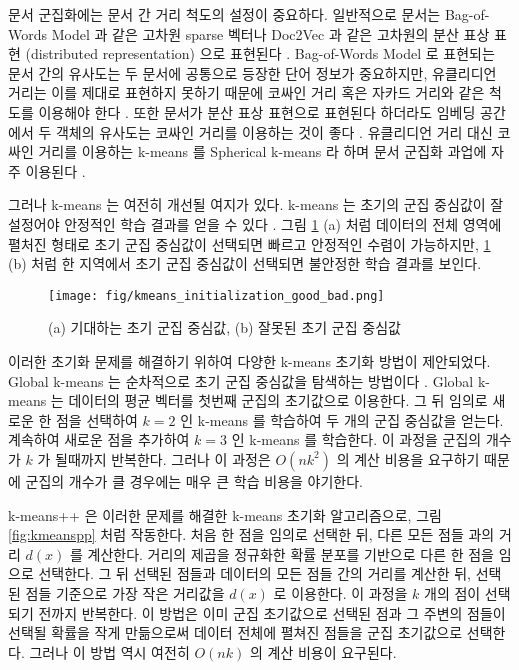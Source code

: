 \documentclass[oneside, ko,phd]{snuthesis_utf8_kor}
\begin{document}
문서 군집화에는 문서 간 거리 척도의 설정이 중요하다.
일반적으로 문서는 Bag-of-Words Model 과 같은 고차원 sparse 벡터나 Doc2Vec 과 같은 고차원의 분산 표상 표현 (distributed representation) 으로 표현된다 \cite{le2014distributed, dai2015document}.
Bag-of-Words Model 로 표현되는 문서 간의 유사도는 두 문서에 공통으로 등장한 단어 정보가 중요하지만, 유클리디언 거리는 이를 제대로 표현하지 못하기 때문에 코싸인 거리 혹은 자카드 거리와 같은 척도를 이용해야 한다 \cite{huang2008similarity}.
또한 문서가 분산 표상 표현으로 표현된다 하더라도 임베딩 공간에서 두 객체의 유사도는 코싸인 거리를 이용하는 것이 좋다 \cite{levy2015improving}.
유클리디언 거리 대신 코싸인 거리를 이용하는 k-means 를 Spherical k-means 라 하며 문서 군집화 과업에 자주 이용된다 \cite{dhillon2002iterative, buchta2012spherical}.

그러나 k-means 는 여전히 개선될 여지가 있다.
k-means 는 초기의 군집 중심값이 잘 설정어야 안정적인 학습 결과를 얻을 수 있다 \cite{arthur2007k}.
그림 \ref{fig:initialization_good_bad} (a) 처럼 데이터의 전체 영역에 펼처진 형태로 초기 군집 중심값이 선택되면 빠르고 안정적인 수렴이 가능하지만, \ref{fig:initialization_good_bad} (b) 처럼 한 지역에서 초기 군집 중심값이 선택되면 불안정한 학습 결과를 보인다.

\begin{figure}[H]
\centering
\texttt{[image: fig/kmeans\_initialization\_good\_bad.png]}
\caption{(a) 기대하는 초기 군집 중심값, (b) 잘못된 초기 군집 중심값}
\label{fig:initialization_good_bad}
\end{figure}

이러한 초기화 문제를 해결하기 위하여 다양한 k-means 초기화 방법이 제안되었다.
Global k-means 는 순차적으로 초기 군집 중심값을 탐색하는 방법이다 \cite{likas2003global, bagirov2008modified}.
Global k-means 는 데이터의 평균 벡터를 첫번째 군집의 초기값으로 이용한다.
그 뒤 임의로 새로운 한 점을 선택하여 $k=2$ 인 k-means 를 학습하여 두 개의 군집 중심값을 얻는다.
계속하여 새로운 점을 추가하여 $k=3$ 인 k-means 를 학습한다.
이 과정을 군집의 개수가 $k$ 가 될때까지 반복한다.
그러나 이 과정은 $O(nk^2)$ 의 계산 비용을 요구하기 때문에 군집의 개수가 클 경우에는 매우 큰 학습 비용을 야기한다.

k-means++ \cite{arthur2007k} 은 이러한 문제를 해결한 k-means 초기화 알고리즘으로, 그림 \ref{fig:kmeanspp} 처럼 작동한다.
처음 한 점을 임의로 선택한 뒤, 다른 모든 점들 과의 거리 $d(x)$ 를 계산한다.
거리의 제곱을 정규화한 확률 분포를 기반으로 다른 한 점을 임으로 선택한다.
그 뒤 선택된 점들과 데이터의 모든 점들 간의 거리를 계산한 뒤, 선택된 점들 기준으로 가장 작은 거리값을 $d(x)$ 로 이용한다.
이 과정을 $k$ 개의 점이 선택되기 전까지 반복한다.
이 방법은 이미 군집 초기값으로 선택된 점과 그 주변의 점들이 선택될 확률을 작게 만듦으로써 데이터 전체에 펼쳐진 점들을 군집 초기값으로 선택한다.
그러나 이 방법 역시 여전히 $O(nk)$ 의 계산 비용이 요구된다.
\end{document}
